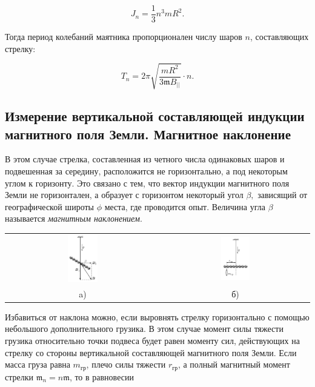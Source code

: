 \documentclass[a4paper,12pt]{article} %
\begin{document}
$$
J_{n} = \frac{1}{3}n^3mR^2.
$$

\hfill \break Тогда период колебаний маятника пропорционален числу шаров $n$, составляющих стрелку:

$$
T_{n} = 2\pi\sqrt{\frac{mR^2}{3\mathfrak{m}B_{||}}}\cdot n.
$$

\subsection{Измерение вертикальной составляющей индукции магнитного поля Земли. Магнитное наклонение}

\hfill \break В этом случае стрелка, составленная из четного числа одинаковых шаров и подвешенная за середину, расположится не горизонтально, а под некоторым углом к горизонту. Это связано с тем, что вектор индукции магнитного поля Земли не горизонтален, а образует с горизонтом некоторый угол $\beta,$ зависящий от географической широты $\phi$ места, где проводится опыт. Величина угла $\beta$ называется \textit {магнитным наклонением}.

\hfill \break \begin{center}
\begin{tabular}{cc}
\includegraphics[width=0.2\textwidth]{3.1.3_4.png}&\includegraphics[width=0.2\textwidth]{3.1.3_5.png}\\
a)&б)\\
\end{tabular}
\end{center}

\hfill \break Избавиться от наклона можно, если выровнять стрелку горизонтально с помощью небольшого дополнительного грузика. В этом случае момент силы тяжести грузика относительно точки подвеса будет равен моменту сил, действующих на стрелку со стороны вертикальной составляющей магнитного поля Земли. Если масса груза равна $m_\text{гр}$, плечо силы тяжести $r_\text{гр}$, а полный магнитный момент стрелки $\mathfrak{m}_{n} = n\mathfrak{m}$, то в равновесии
\end{document}
